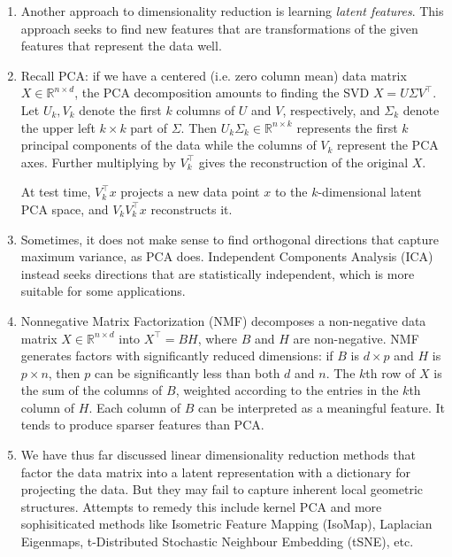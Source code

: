 \documentclass[10pt]{article}
\begin{document}
\begin{multicols}{2}
\begin{addmargin}[0.8em]{0.5em}
\begin{enumerate}[label=(\alph*)]
        \item Another approach to dimensionality reduction is learning \textit{latent features}. This approach seeks to find new features that are transformations of the given features that represent the data well.
        
        \item Recall PCA: if we have a centered (i.e. zero column mean) data matrix $X \in \mathbb{R}^{n \times d}$, the PCA decomposition amounts to finding the SVD $X = U \Sigma V^\top$. Let $U_k, V_k$ denote the first $k$ columns of $U$ and $V$, respectively, and $\Sigma_k$ denote the upper left $k \times k$ part of $\Sigma$. Then $U_k \Sigma_k \in \mathbb{R}^{n \times k}$ represents the first $k$ principal components of the data while the columns of $V_k$ represent the PCA axes. Further multiplying by $V_k^\top$ gives the reconstruction of the original $X$.

        At test time, $V_k^\top x$ projects a new data point $x$ to the $k$-dimensional latent PCA space, and $V_k V_k^\top x$ reconstructs it. 
        
        \item Sometimes, it does not make sense to find orthogonal directions that capture maximum variance, as PCA does. Independent Components Analysis (ICA) instead seeks directions that are statistically independent, which is more suitable for some applications.
        
        \item Nonnegative Matrix Factorization (NMF) decomposes a non-negative data matrix $X \in \mathbb{R}^{n \times d}$ into $X^\top = BH$, where $B$ and $H$ are non-negative. NMF generates factors with significantly reduced dimensions: if $B$ is $d \times p$ and $H$ is $p \times n$, then $p$ can be significantly less than both $d$ and $n$. The $k$th row of $X$ is the sum of the columns of $B$, weighted according to the entries in the $k$th column of $H$. Each column of $B$ can be interpreted as a meaningful feature. It tends to produce sparser features than PCA.
        
        \item We have thus far discussed linear dimensionality reduction methods that factor the data matrix into a latent representation with a dictionary for projecting the data. But they may fail to capture inherent local geometric structures. Attempts to remedy this include kernel PCA and more sophisiticated methods like Isometric Feature Mapping (IsoMap), Laplacian Eigenmaps, t-Distributed Stochastic Neighbour Embedding (tSNE), etc.
    \end{enumerate}
    

\end{addmargin}
\end{multicols}
\end{document}

